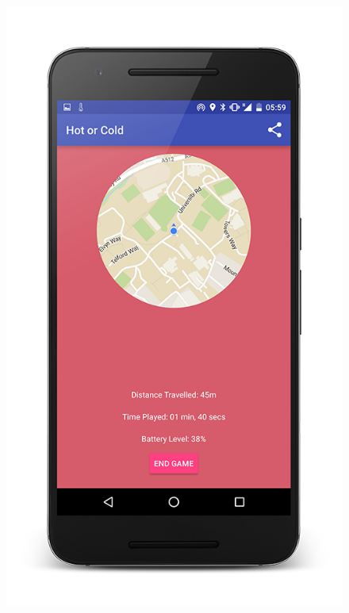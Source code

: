 \documentclass[10pt, a4paper]{article}
\begin{document}
\begin{figure}[!htb]
  \includegraphics[width=1.0\textwidth]{phone_game_3}
  \caption{}
\endminipage
\end{figure}
\end{document}
